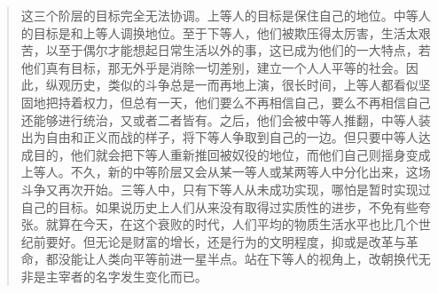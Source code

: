 \begin{paracol}{2}
\begin{quotation}
这三个阶层的目标完全无法协调。上等人的目标是保住自己的地位。中等人的目标是和上等人调换地位。至于下等人，他们被欺压得太厉害，生活太艰苦，以至于偶尔才能想起日常生活以外的事，这已成为他们的一大特点，若他们真有目标，那无外乎是消除一切差别，建立一个人人平等的社会。因此，纵观历史，类似的斗争总是一而再地上演，很长时间，上等人都看似坚固地把持着权力，但总有一天，他们要么不再相信自己，要么不再相信自己还能够进行统治，又或者二者皆有。之后，他们会被中等人推翻，中等人装出为自由和正义而战的样子，将下等人争取到自己的一边。但只要中等人达成目的，他们就会把下等人重新推回被奴役的地位，而他们自己则摇身变成上等人。不久，新的中等阶层又会从某一等人或某两等人中分化出来，这场斗争又再次开始。三等人中，只有下等人从未成功实现，哪怕是暂时实现过自己的目标。如果说历史上人们从来没有取得过实质性的进步，不免有些夸张。就算在今天，在这个衰败的时代，人们平均的物质生活水平也比几个世纪前要好。但无论是财富的增长，还是行为的文明程度，抑或是改革与革命，都没能让人类向平等前进一星半点。站在下等人的视角上，改朝换代无非是主宰者的名字发生变化而已。

\switchcolumn*


\end{quotation}
\end{paracol}
